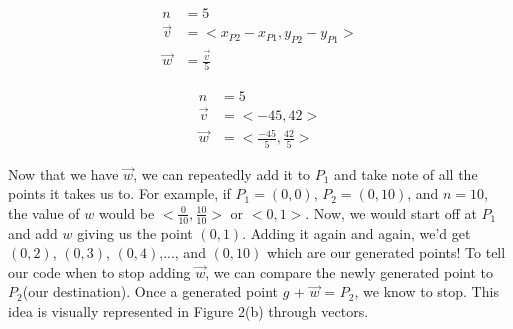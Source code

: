 \documentclass[14pt]{article}
\begin{document}
\begin{figure}[H]
	\begin{center}
		\begin{minipage}[b]{0.48\textwidth}
			\centering	
			$$
				\begin{aligned}
					n &= 5 \\
					\overrightarrow{v} &= <x_{P2} - x_{P1}, y_{P2} - y_{P1}> \\
					\overrightarrow{w} &= \frac{\overrightarrow{v}}{5}
				\end{aligned}
			$$
		\end{minipage}
		\hfill
		\begin{minipage}[b]{0.48\textwidth}
			\centering
			$$
				\begin{aligned}
					n &= 5 \\
					\overrightarrow{v} &= <-45, 42> \\
					\overrightarrow{w} &= <\frac{-45}{5}, \frac{42}{5}>
				\end{aligned}
			$$
		\end{minipage}
	\end{center}
\end{figure}

Now that we have $\overrightarrow{w}$, we can repeatedly add it to $P_1$ and take note of all the points it takes us to. For example, if $P_1 = (0, 0)$, $P_2 = (0, 10)$, and $n = 10$, the value of $w$ would be $<\frac{0}{10}, \frac{10}{10}>$ or $<0, 1>$. Now, we would start off at $P_1$ and add $w$ giving us the point $(0, 1)$. Adding it again and again, we'd get $(0, 2)$, $(0, 3)$, $(0, 4)$,..., and $(0, 10)$ which are our generated points! To tell our code when to stop adding $\overrightarrow{w}$, we can compare the newly generated point to $P_2$(our destination). Once a generated point $g$ + $\overrightarrow{w}$ = $P_2$, we know to stop. This idea is visually represented in Figure 2(b) through vectors. 

\vspace{1em}
\end{document}
